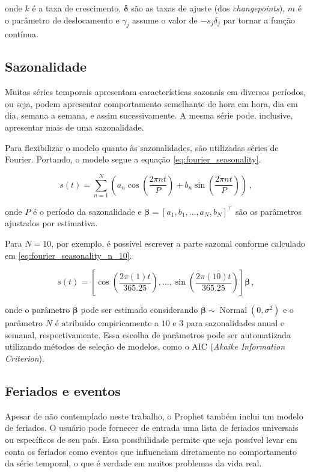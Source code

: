 onde $k$ é a taxa de crescimento, $\boldsymbol{\delta}$ são as taxas de ajuste (dos \textit{changepoints}), $m$ é o parâmetro de deslocamento e $\gamma_{j}$ assume o valor de $-s_{j}\delta_{j}$ par tornar a função contínua.

\subsection{Sazonalidade}
Muitas séries temporais apresentam características sazonais em diversos períodos, ou seja, podem apresentar comportamento semelhante de hora em hora, dia em dia, semana a semana, e assim sucessivamente. A mesma série pode, inclusive, apresentar mais de uma sazonalidade.

Para flexibilizar o modelo quanto às sazonalidades, são utilizadas séries de Fourier. Portando, o modelo segue a equação \eqref{eq:fourier_seasonality}.

\begin{equation} \label{eq:fourier_seasonality}
    s(t)=\sum_{n=1}^{N}\left(a_{n} \cos \left(\frac{2 \pi n t}{P}\right)+b_{n} \sin \left(\frac{2 \pi n t}{P}\right)\right)\, ,
\end{equation}

onde $P$ é o período da sazonalidade e $\boldsymbol{\beta} = [a_{1},b_{1},\ldots,a_{N},b_{N}]^{\top}$ são os parâmetros ajustados por estimativa.

Para $N=10$, por exemplo, é possível escrever a parte sazonal conforme calculado em \eqref{eq:fourier_seasonality_n_10}.

\begin{equation} \label{eq:fourier_seasonality_n_10}
    s(t)=\left[\cos \left(\frac{2 \pi(1) t}{365.25}\right), \ldots, \sin \left(\frac{2 \pi(10) t}{365.25}\right)\right]\boldsymbol{\beta} \, ,
\end{equation}

onde o parâmetro $\boldsymbol{\beta}$ pode ser estimado considerando $\boldsymbol{\beta} \sim \operatorname{Normal}\left(0, \sigma^{2}\right)$ e o parâmetro $N$ é atribuido empiricamente a $10$ e $3$ para sazonalidades anual e semanal, respectivamente. Essa escolha de parâmetros pode ser automatizada utilizando métodos de seleção de modelos, como o AIC (\textit{Akaike Information Criterion}).

\subsection{Feriados e eventos}
Apesar de não contemplado neste trabalho, o Prophet também inclui um modelo de feriados. O usuário pode fornecer de entrada uma lista de feriados universais ou específicos de seu país. Essa possibilidade permite que seja possível levar em conta os feriados como eventos que influenciam diretamente no comportamento da série temporal, o que é verdade em muitos problemas da vida real.

